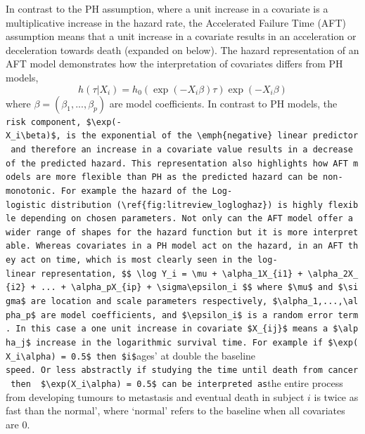 \documentclass[
  letterpaper,
]{scrbook}
\theoremstyle{plain}
\theoremstyle{definition}
\theoremstyle{remark}
\begin{document}
In contrast to the PH assumption, where a unit increase in a covariate
is a multiplicative increase in the hazard rate, the Accelerated Failure
Time (AFT) assumption means that a unit increase in a covariate results
in an acceleration or deceleration towards death (expanded on below).
The hazard representation of an AFT model demonstrates how the
interpretation of covariates differs from PH models, \[
h(\tau|X_i)= h_0(\exp(-X_i\beta)\tau)\exp(-X_i\beta)
\] where \(\beta = (\beta_1,...,\beta_p)\) are model coefficients. In
contrast to PH models, the
\texttt{risk\textquotesingle{}\ component,\ \$\textbackslash{}exp(-X\_i\textbackslash{}beta)\$,\ is\ the\ exponential\ of\ the\ \textbackslash{}emph\{negative\}\ linear\ predictor\ and\ therefore\ an\ increase\ in\ a\ covariate\ value\ results\ in\ a\ decrease\ of\ the\ predicted\ hazard.\ This\ representation\ also\ highlights\ how\ AFT\ models\ are\ more\ flexible\ than\ PH\ as\ the\ predicted\ hazard\ can\ be\ non-monotonic.\ For\ example\ the\ hazard\ of\ the\ Log-logistic\ distribution\ (\textbackslash{}ref\{fig:litreview\_logloghaz\})\ is\ highly\ flexible\ depending\ on\ chosen\ parameters.\ Not\ only\ can\ the\ AFT\ model\ offer\ a\ wider\ range\ of\ shapes\ for\ the\ hazard\ function\ but\ it\ is\ more\ interpretable.\ Whereas\ covariates\ in\ a\ PH\ model\ act\ on\ the\ hazard,\ in\ an\ AFT\ they\ act\ on\ time,\ which\ is\ most\ clearly\ seen\ in\ the\ log-linear\ representation,\ \$\$\ \textbackslash{}log\ Y\_i\ =\ \textbackslash{}mu\ +\ \textbackslash{}alpha\_1X\_\{i1\}\ +\ \textbackslash{}alpha\_2X\_\{i2\}\ +\ ...\ +\ \textbackslash{}alpha\_pX\_\{ip\}\ +\ \textbackslash{}sigma\textbackslash{}epsilon\_i\ \$\$\ where\ \$\textbackslash{}mu\$\ and\ \$\textbackslash{}sigma\$\ are\ location\ and\ scale\ parameters\ respectively,\ \$\textbackslash{}alpha\_1,...,\textbackslash{}alpha\_p\$\ are\ model\ coefficients,\ and\ \$\textbackslash{}epsilon\_i\$\ is\ a\ random\ error\ term.\ In\ this\ case\ a\ one\ unit\ increase\ in\ covariate\ \$X\_\{ij\}\$\ means\ a\ \$\textbackslash{}alpha\_j\$\ increase\ in\ the\ logarithmic\ survival\ time.\ For\ example\ if\ \$\textbackslash{}exp(X\_i\textbackslash{}alpha)\ =\ 0.5\$\ then\ \$i\$}ages'
at double the baseline
\texttt{speed\textquotesingle{}.\ Or\ less\ abstractly\ if\ studying\ the\ time\ until\ death\ from\ cancer\ then\ \ \$\textbackslash{}exp(X\_i\textbackslash{}alpha)\ =\ 0.5\$\ can\ be\ interpreted\ as}the
entire process from developing tumours to metastasis and eventual death
in subject \(i\) is twice as fast than the normal', where `normal'
refers to the baseline when all covariates are \(0\).
\end{document}
